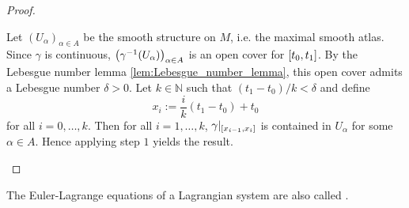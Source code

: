 \begin{proof}
\begin{enumerate}[label = \textit{Step \arabic*:},wide=0pt]
			Let $(U_\alpha)_{\alpha \in A}$ be the smooth structure on $M$, i.e. the maximal smooth atlas. Since $\gamma$ is continuous, $\del[1]{\gamma^{-1}(U_\alpha)}_{\alpha \in A}$ is an open cover for $\intcc[0]{t_0,t_1}$. By the Lebesgue number lemma \ref{lem:Lebesgue_number_lemma}, this open cover admits a Lebesgue number $\delta > 0$. Let $k \in \mathbb{N}$ such that $(t_1 - t_0)/k < \delta$ and define
			\begin{equation*}
				x_i := \frac{i}{k}(t_1 - t_0) + t_0
			\end{equation*}
			\noindent for all $i = 0,\dots,k$. Then for all $i = 1,\dots,k$, $\gamma\vert_{\intcc[0]{x_{i - 1},x_i}}$ is contained in $U_\alpha$ for some $\alpha \in A$. Hence applying step $1$ yields the result.
	\end{enumerate}
\end{proof}

\begin{definition}
	The Euler-Lagrange equations of a Lagrangian system are also called .
\end{definition}
